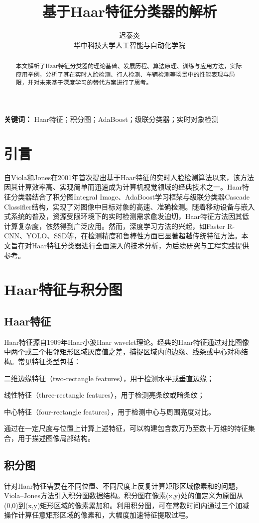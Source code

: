 \documentclass[UTF8]{ctexart}
\title{基于Haar特征分类器的解析}
\author{迟泰炎 \\ 华中科技大学人工智能与自动化学院}
\date{}
\begin{document}
\maketitle

\begin{abstract}
本文解析了Haar特征分类器的理论基础、发展历程、算法原理、训练与应用方法，实际应用举例，分析了其在实时人脸检测、行人检测、车辆检测等场景中的性能表现与局限，并对未来基于深度学习的替代方案进行了思考。
\end{abstract}

\noindent\textbf{关键词：} Haar特征；积分图；AdaBoost；级联分类器；实时对象检测

\section{引言}
自Viola和Jones在2001年首次提出基于Haar特征的实时人脸检测算法以来，该方法因其计算效率高、实现简单而迅速成为计算机视觉领域的经典技术之一\cite{viola2001}。Haar特征分类器结合了积分图Integral Image、AdaBoost学习框架与级联分类器Cascade Classifier结构，实现了对图像中目标对象的高速、准确检测。随着移动设备与嵌入式系统的普及，资源受限环境下的实时检测需求愈发迫切，Haar特征方法因其低计算复杂度，依然得到广泛应用。然而，深度学习方法的兴起，如Faster R-CNN、YOLO、SSD等，在检测精度和鲁棒性方面已显著超越传统特征方法\cite{dalal2005}。本文旨在对Haar特征分类器进行全面深入的技术分析，为后续研究与工程实践提供参考。

\section{Haar特征与积分图}
\subsection{Haar特征}
Haar特征源自1909年Haar小波Haar wavelet理论。经典的Haar特征通过对比图像中两个或三个相邻矩形区域灰度值之差，捕捉区域内的边缘、线条或中心对称结构\cite{lienhart2002}。常见特征类型包括：

二维边缘特征（two-rectangle features），用于检测水平或垂直边缘；

线性特征（three-rectangle features），用于检测亮条纹或暗条纹；

中心特征（four-rectangle features），用于检测中心与周围亮度对比。

通过在一定尺度与位置上计算上述特征，可以构建包含数万乃至数十万维的特征集合，用于描述图像局部结构。

\subsection{积分图}
针对Haar特征需要在不同位置、不同尺度上反复计算矩形区域像素和的问题，Viola–Jones方法引入积分图数据结构。积分图在像素(x,y)处的值定义为原图从(0,0)到(x,y)矩形区域的像素累加和。利用积分图，可在常数时间内通过三个加减操作计算任意矩形区域的像素和，大幅度加速特征提取过程。
\end{document}

